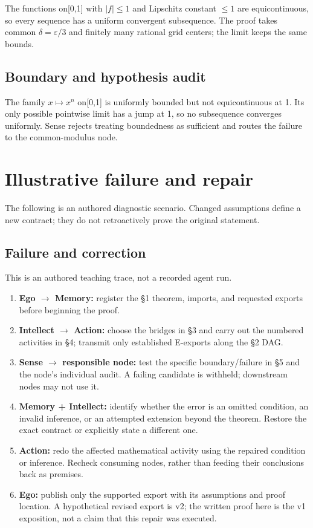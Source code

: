 \documentclass[preprint,12pt,aps,pra,showkeys,amsmath,amssymb,superscriptaddress,floatfix]{revtex4-2}
\theoremstyle{definition}
\theoremstyle{remark}
\providecommand{\tightlist}{\setlength{\itemsep}{2pt}\setlength{\parskip}{0pt}}
\begin{document}
The functions on{[}0,1{]} with \(|f|\le 1\) and Lipschitz constant
\(\le 1\) are equicontinuous, so every sequence has a uniform convergent
subsequence. The proof takes common \(\delta =\varepsilon /3\) and
finitely many rational grid centers; the limit keeps the same bounds.

\subsection{Boundary and hypothesis audit}

The family \(x\mapsto x^{n}\) on{[}0,1{]} is uniformly bounded but not
equicontinuous at 1. Its only possible pointwise limit has a jump at 1,
so no subsequence converges uniformly. Sense rejects treating
boundedness as sufficient and routes the failure to the common-modulus
node.

\section{Illustrative failure and repair}

The following is an authored diagnostic scenario. Changed assumptions
define a new contract; they do not retroactively prove the original
statement.

\subsection{Failure and correction}
This is an authored teaching trace, not a recorded agent run.

\begin{enumerate}
\def\labelenumi{\arabic{enumi}.}
\tightlist
\item
  \textbf{Ego \(\to\) Memory:} register the §1 theorem, imports, and
  requested exports before beginning the proof.
\item
  \textbf{Intellect \(\to\) Action:} choose the bridges in §3 and carry
  out the numbered activities in §4; transmit only established E-exports
  along the §2 DAG.
\item
  \textbf{Sense \(\to\) responsible node:} test the specific
  boundary/failure in §5 and the node's individual audit. A failing
  candidate is withheld; downstream nodes may not use it.
\item
  \textbf{Memory + Intellect:} identify whether the error is an omitted
  condition, an invalid inference, or an attempted extension beyond the
  theorem. Restore the exact contract or explicitly state a different
  one.
\item
  \textbf{Action:} redo the affected mathematical activity using the
  repaired condition or inference. Recheck consuming nodes, rather than
  feeding their conclusions back as premises.
\item
  \textbf{Ego:} publish only the supported export with its assumptions
  and proof location. A hypothetical revised export is v2; the written
  proof here is the v1 exposition, not a claim that this repair was
  executed.
\end{enumerate}
\end{document}
